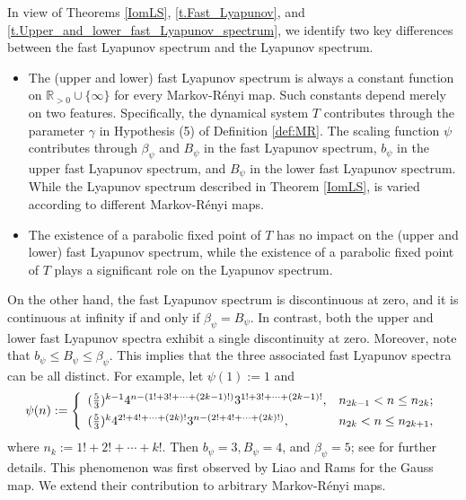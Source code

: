 \documentclass[12pt,reqno]{amsart}
\renewcommand{\=}{\coloneqq}
\theoremstyle{plain}
\begin{document}
In view of Theorems \ref{IomLS}, \ref{t.Fast_Lyapunov}, and \ref{t.Upper_and_lower_fast_Lyapunov_spectrum}, we identify two key differences between the fast Lyapunov spectrum and the Lyapunov spectrum.
\begin{itemize}
\item[(i)] The (upper and lower) fast Lyapunov spectrum is always a constant function on $\mathbb{R}_{>0} \cup\{\infty\}$ for every Markov-R\'{e}nyi map. Such constants depend merely on two features. Specifically, the dynamical system $T$ contributes through the parameter $\gamma$ in Hypothesis (5) of Definition \ref{def:MR}. The scaling function $\psi$ contributes through $\beta_\psi$ and $B_\psi$ in the fast Lyapunov spectrum, $b_\psi$ in the upper fast Lyapunov spectrum, and $B_\psi$ in the lower fast Lyapunov spectrum. While the Lyapunov spectrum described in Theorem \ref{IomLS}, is varied according to different Markov-R\'{e}nyi maps.
\item[(ii)] The existence of a parabolic fixed point of $T$ has no impact on the (upper and lower) fast Lyapunov spectrum, while the existence of a parabolic fixed point of $T$ plays a significant role on the Lyapunov spectrum.
\end{itemize}
On the other hand, the fast Lyapunov spectrum is discontinuous at zero, and it is continuous at infinity if and only if $\beta_\psi =B_\psi$. In contrast, both the upper and lower fast Lyapunov spectra exhibit a single discontinuity at zero. Moreover, note that $b_\psi\leq B_\psi\leq \beta_\psi$. This implies that the three associated fast Lyapunov spectra can be all distinct. For example,
let $\psi(1):=1$ and
$$
\psi(n):=
\left\{
  \begin{array}{ll}
    (\frac{5}{3})^{k-1}4^{n-(1!+3!+\cdots+(2k-1)!)}3^{1!+3!+\cdots+(2k-1)!}, & \hbox{$n_{2k-1}<n\leq n_{2k}$;} \vspace{0.15cm}\\
    (\frac{5}{3})^{k}4^{2!+4!+\cdots+(2k)!}3^{n- (2!+4!+\cdots+(2k)!)},& \hbox{$n_{2k}<n \leq n_{2k+1}$,}
  \end{array}
\right.
$$
where $n_k:=1!+2!+\cdots+k!$. Then $b_\psi=3, B_\psi=4$, and $\beta_\psi=5$; see \cite{FSW} for further details.
This phenomenon was first observed by Liao and Rams \cite{LR} for the Gauss map. We extend their contribution to arbitrary Markov-R\'{e}nyi maps.
\end{document}
